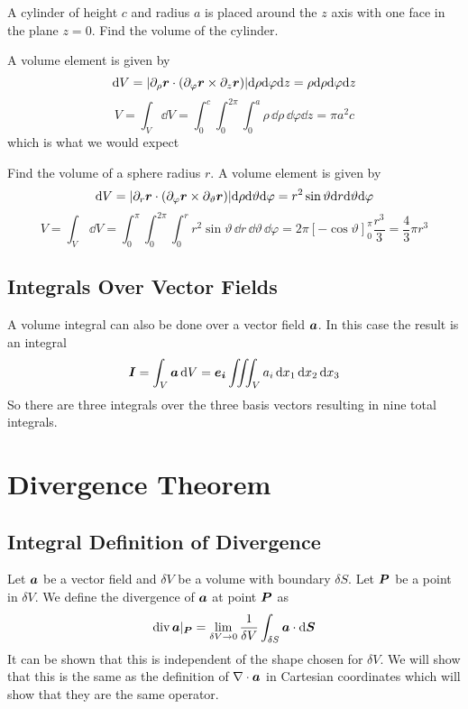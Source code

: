 \documentclass{article}
\newcommand{\divword}{\mathop{\mathrm{div}}}
\begin{document}
    \example
    A cylinder of height \(c\) and radius \(a\) is placed around the \(z\) axis with one face in the plane \(z = 0\).
    Find the volume of the cylinder.
    
    A volume element is given by
    \[\dd V = |\partial_\rho\bm{r}\cdot(\partial_\varphi\bm{r}\times\partial_z\bm{r})|\dd\rho\dd\varphi\dd z = \rho\dd\rho\dd\varphi\dd z\]
    \[V = \int_V\dd V = \int_0^c\int_0^{2\pi}\int_0^a\rho\,\dd\rho\,\dd\varphi\dd z = \pi a^2 c\]
    which is what we would expect
    
    \example
    Find the volume of a sphere radius \(r\).
    A volume element is given by
    \[\dd V = |\partial_r\bm{r}\cdot(\partial_\varphi\bm{r}\times\partial_\vartheta\bm{r})|\dd\rho\dd\vartheta\dd\varphi = r^2\sin\vartheta\dd r\dd\vartheta\dd\varphi\]
    \[V = \int_V\,\dd V = \int_0^\pi\int_0^{2\pi}\int_0^r r^2\sin\vartheta\,\dd r\,\dd\vartheta\,\dd\varphi = 2\pi[-\cos\vartheta]_0^\pi\frac{r^3}{3} = \frac{4}{3}\pi r^3\]
    
    \subsection{Integrals Over Vector Fields}
    A volume integral can also be done over a vector field \(\bm{a}\).
    In this case the result is an integral
    \[\bm{I} = \int_V\bm{a}\,\dd V = \bm{e_{i}}\iiint_V a_i\,\dd x_1\,\dd x_2\,\dd x_3\]
    So there are three integrals over the three basis vectors resulting in nine total integrals.
    
    \section{Divergence Theorem}
    \subsection{Integral Definition of Divergence}
    Let \(\bm{a}\) be a vector field and \(\delta V\) be a volume with boundary \(\delta S\).
    Let \(\bm{P}\) be a point in \(\delta V\).
    We define the divergence of \(\bm{a}\) at point \(\bm{P}\) as
    \[\divword\vv a|_{\vv P} = \lim_{\delta V\to 0}\frac{1}{\delta V} \int_{\delta S} \vv a\cdot\dd\vv S\]
    It can be shown that this is independent of the shape chosen for \(\delta V\).
    We will show that this is the same as the definition of \(\nabla\cdot\bm{a}\) in Cartesian coordinates which will show that they are the same operator.
    
\end{document}
